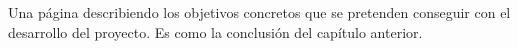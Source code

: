 Una página describiendo los objetivos concretos que se pretenden conseguir con el desarrollo del proyecto. Es como la conclusión del capítulo anterior.
